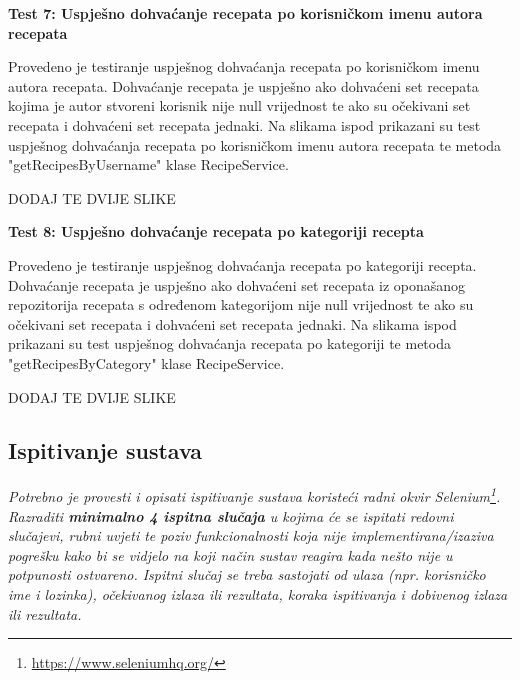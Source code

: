		\textbf{Test 7: Uspješno dohvaćanje recepata po korisničkom imenu autora recepata}
		
		Provedeno je testiranje uspješnog dohvaćanja recepata po korisničkom imenu autora recepata. Dohvaćanje recepata je uspješno ako dohvaćeni set recepata kojima je autor stvoreni korisnik nije null vrijednost te ako su očekivani set recepata i dohvaćeni set recepata jednaki. Na slikama ispod prikazani su test uspješnog dohvaćanja recepata po korisničkom imenu autora recepata te metoda "getRecipesByUsername" klase RecipeService.
		
		DODAJ TE DVIJE SLIKE
		
		
		\textbf{Test 8: Uspješno dohvaćanje recepata po kategoriji recepta}
		
		Provedeno je testiranje uspješnog dohvaćanja recepata po kategoriji recepta. Dohvaćanje recepata je uspješno ako dohvaćeni set recepata iz oponašanog repozitorija recepata s određenom kategorijom nije null vrijednost te ako su očekivani set recepata i dohvaćeni set recepata jednaki. Na slikama ispod prikazani su test uspješnog dohvaćanja recepata po kategoriji te metoda "getRecipesByCategory" klase RecipeService.
		
		DODAJ TE DVIJE SLIKE

		
		

















			
			
			
			\subsection{Ispitivanje sustava}
			
			 \textit{Potrebno je provesti i opisati ispitivanje sustava koristeći radni okvir Selenium\footnote{\url{https://www.seleniumhq.org/}}. Razraditi \textbf{minimalno 4 ispitna slučaja} u kojima će se ispitati redovni slučajevi, rubni uvjeti te poziv funkcionalnosti koja nije implementirana/izaziva pogrešku kako bi se vidjelo na koji način sustav reagira kada nešto nije u potpunosti ostvareno. Ispitni slučaj se treba sastojati od ulaza (npr. korisničko ime i lozinka), očekivanog izlaza ili rezultata, koraka ispitivanja i dobivenog izlaza ili rezultata.\\ }
			 
